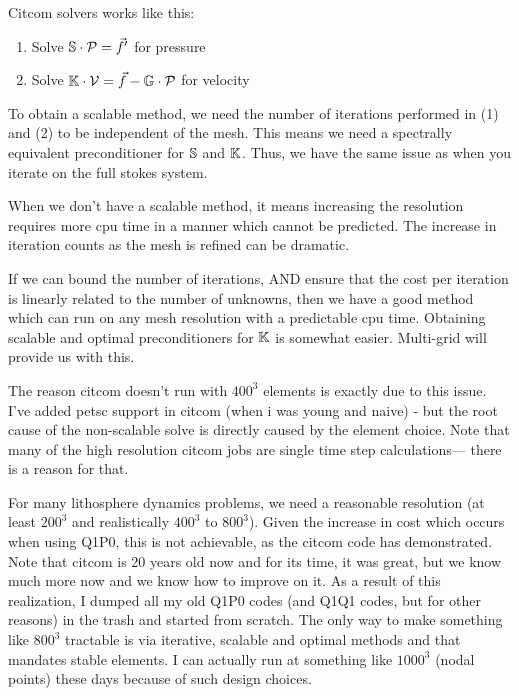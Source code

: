 Citcom solvers works like this:
\begin{enumerate}
\item Solve ${\mathbb{S}} \cdot {\cal P} = \vec f'$  for pressure
\item Solve ${\mathbb{K}} \cdot {\cal V} = \vec f - {\mathbb{G}} \cdot {\cal P}$ for velocity
\end{enumerate}
To obtain a scalable method, we need the number of iterations performed in (1) and (2)
to be independent of the mesh. This means we need a spectrally equivalent preconditioner
for ${\mathbb{S}}$ and ${\mathbb{K}}$. Thus, we have the same issue as when you iterate on the full stokes system.

When we don't have a scalable method, it means increasing the resolution requires 
more cpu time in a manner which cannot be predicted. The increase in iteration counts 
as the mesh is refined can be dramatic.

If we can bound the number of iterations, AND ensure that the cost per iteration is 
linearly related to the number of unknowns, then we have a good method which can 
run on any mesh resolution with a predictable cpu time. Obtaining scalable and 
optimal preconditioners for ${\mathbb{K}}$ is somewhat easier. Multi-grid will provide us with this.

The reason citcom doesn't run with $400^3$ elements is exactly due to this issue.
I've added petsc support in citcom (when i was young and naive) - but the root cause of the
non-scalable solve is directly caused by the element choice. Note that many of the high resolution
citcom jobs are single time step calculations--- there is a reason for that.

For many lithosphere dynamics problems, we need a reasonable resolution (at least $200^3$ and realistically $400^3$ to $800^3$). Given the increase in cost which occurs when using Q1P0, this is not achievable, as the citcom code has demonstrated.
Note that citcom is 20 years old now and for its time, it was great, 
but we know much more now and we know how to improve on it.
As a result of this realization, I dumped all my old Q1P0 codes (and Q1Q1 codes, but for other reasons) 
in the trash and started from scratch. The only way to make something like $800^3$ tractable is via iterative, scalable and optimal methods and
that mandates stable elements. I can actually run at something like $1000^3$ (nodal points) these days because of such design choices.


